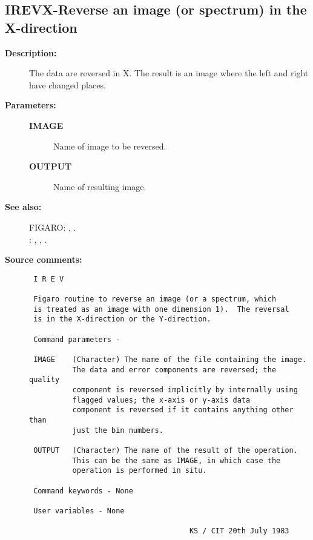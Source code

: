 \subsection{IREVX-\label{IREVX}Reverse an image (or spectrum) in the X-direction}
\begin{description}

\item [{\bf Description:}]
 The data are reversed in X.  The result is an image where
 the left and right have changed places.

\item [{\bf Parameters:}]
\begin{description}
\item [{\bf IMAGE}]
 Name of image to be reversed.
\item [{\bf OUTPUT}]
 Name of resulting image.
\end{description}

\item [{\bf See also:}]
FIGARO: , .\\
: , , .\\

\item [{\bf Source comments:}]
\begin{verbatim}
 I R E V

 Figaro routine to reverse an image (or a spectrum, which
 is treated as an image with one dimension 1).  The reversal
 is in the X-direction or the Y-direction.

 Command parameters -

 IMAGE    (Character) The name of the file containing the image.
          The data and error components are reversed; the quality
          component is reversed implicitly by internally using
          flagged values; the x-axis or y-axis data
          component is reversed if it contains anything other than
          just the bin numbers.

 OUTPUT   (Character) The name of the result of the operation.
          This can be the same as IMAGE, in which case the
          operation is performed in situ.

 Command keywords - None

 User variables - None

                                     KS / CIT 20th July 1983
\end{verbatim}
\end{description}
